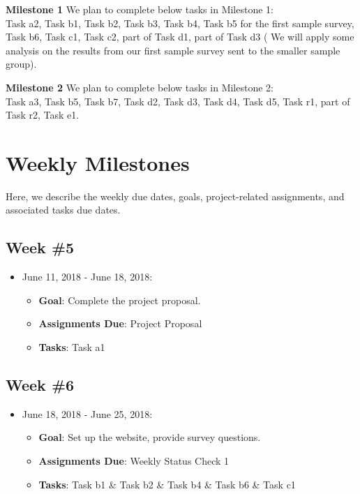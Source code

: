 \documentclass{sigchi}
\begin{document}
\textbf{Milestone 1}\newline
We plan to complete below tasks in Milestone 1:\\
Task a2, Task b1, Task b2, Task b3, Task b4, Task b5 for the first sample survey, Task b6, Task c1, Task c2, part of Task d1, part of Task d3 ( We will apply some analysis on the results from our first sample survey sent to the smaller sample group).

\textbf{Milestone 2}\newline
We plan to complete below tasks in Milestone 2:\\
Task a3, Task b5, Task b7, Task d2, Task d3, Task d4, Task d5, Task r1, part of Task r2, Task e1.

\section{Weekly Milestones}
Here, we describe the weekly due dates, goals, project-related assignments, and associated tasks due dates.

\subsection{Week \#5}
\begin{itemize}
 	\item June 11, 2018 - June 18, 2018:
	\begin{itemize}
 		\item \textbf{Goal}: Complete the project proposal.
 		\item \textbf{Assignments Due}: Project Proposal
 		\item \textbf{Tasks}: Task a1
 	\end{itemize} 
 \end{itemize}


\subsection{Week \#6}
\begin{itemize}
 	\item June 18, 2018 - June 25, 2018:
	\begin{itemize}
 		\item \textbf{Goal}: Set up the website, provide survey questions.
 		\item \textbf{Assignments Due}: Weekly Status Check 1
 		\item \textbf{Tasks}: Task b1 \& Task b2 \& Task b4 \& Task b6 \& Task c1
	\end{itemize}
 \end{itemize} 
 
\end{document}
